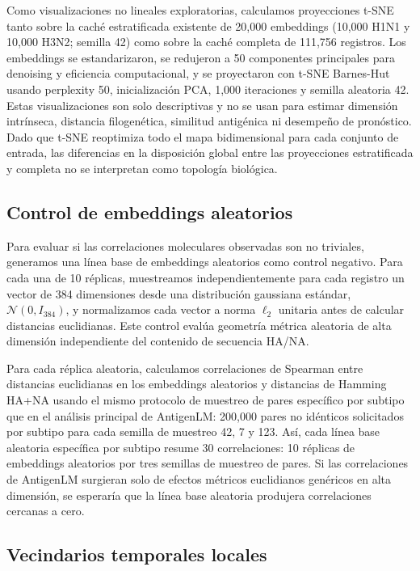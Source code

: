 \documentclass[11pt]{article}
\begin{document}
Como visualizaciones no lineales exploratorias, calculamos proyecciones t-SNE tanto sobre la caché estratificada existente de 20,000 embeddings (10,000 H1N1 y 10,000 H3N2; semilla 42) como sobre la caché completa de 111,756 registros. Los embeddings se estandarizaron, se redujeron a 50 componentes principales para denoising y eficiencia computacional, y se proyectaron con t-SNE Barnes-Hut usando perplexity 50, inicialización PCA, 1,000 iteraciones y semilla aleatoria 42. Estas visualizaciones son solo descriptivas y no se usan para estimar dimensión intrínseca, distancia filogenética, similitud antigénica ni desempeño de pronóstico. Dado que t-SNE reoptimiza todo el mapa bidimensional para cada conjunto de entrada, las diferencias en la disposición global entre las proyecciones estratificada y completa no se interpretan como topología biológica.

\subsection{Control de embeddings aleatorios}

Para evaluar si las correlaciones moleculares observadas son no triviales, generamos una línea base de embeddings aleatorios como control negativo. Para cada una de 10 réplicas, muestreamos independientemente para cada registro un vector de 384 dimensiones desde una distribución gaussiana estándar, $\mathcal{N}(0,I_{384})$, y normalizamos cada vector a norma $\ell_2$ unitaria antes de calcular distancias euclidianas. Este control evalúa geometría métrica aleatoria de alta dimensión independiente del contenido de secuencia HA/NA.

Para cada réplica aleatoria, calculamos correlaciones de Spearman entre distancias euclidianas en los embeddings aleatorios y distancias de Hamming HA+NA usando el mismo protocolo de muestreo de pares específico por subtipo que en el análisis principal de AntigenLM: 200,000 pares no idénticos solicitados por subtipo para cada semilla de muestreo 42, 7 y 123. Así, cada línea base aleatoria específica por subtipo resume 30 correlaciones: 10 réplicas de embeddings aleatorios por tres semillas de muestreo de pares. Si las correlaciones de AntigenLM surgieran solo de efectos métricos euclidianos genéricos en alta dimensión, se esperaría que la línea base aleatoria produjera correlaciones cercanas a cero.

\subsection{Vecindarios temporales locales}
\end{document}
